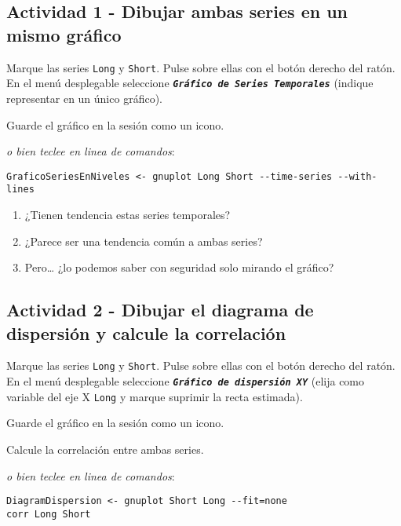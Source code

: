\documentclass[11pt]{article}
\begin{document}
\subsection{Actividad 1 - Dibujar ambas series en un mismo gráfico}
\label{sec:org1705b77}
Marque las series \texttt{Long} y \texttt{Short}. Pulse sobre ellas con el botón
derecho del ratón. En el menú desplegable seleccione \textbf{\emph{\texttt{Gráfico de
Series Temporales}}} (indique representar en un único gráfico).

Guarde el gráfico en la sesión como un icono.

{\vspace{1pt} \footnotesize \color{gray!70!black}
\emph{o bien teclee en linea de comandos}:
\begin{verbatim}
GraficoSeriesEnNiveles <- gnuplot Long Short --time-series --with-lines
\end{verbatim}
}

\vspace{-3pt}

\begin{enumerate}
\item ¿Tienen tendencia estas series temporales?
\item ¿Parece ser una tendencia común a ambas series?
\item Pero\ldots{} ¿lo podemos saber con seguridad solo mirando el gráfico?
\end{enumerate}

\subsection{Actividad 2 - Dibujar el diagrama de dispersión y calcule la correlación}
\label{sec:org02f8cf9}
Marque las series \texttt{Long} y \texttt{Short}. Pulse sobre ellas con el botón
derecho del ratón. En el menú desplegable seleccione \textbf{\emph{\texttt{Gráfico de
dispersión XY}}} (elija como variable del eje X \texttt{Long} y marque
suprimir la recta estimada).

Guarde el gráfico en la sesión como un icono.

Calcule la correlación entre ambas series.

{\vspace{1pt} \footnotesize \color{gray!70!black}
\emph{o bien teclee en linea de comandos}:
\begin{verbatim}
DiagramDispersion <- gnuplot Short Long --fit=none
corr Long Short
\end{verbatim}
}
\end{document}
